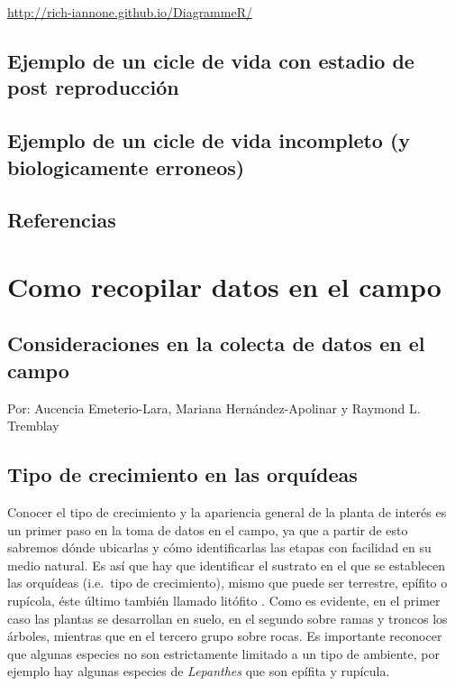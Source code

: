\documentclass[
]{book}
\theoremstyle{definition}
\theoremstyle{definition}
\theoremstyle{definition}
\theoremstyle{definition}
\theoremstyle{remark}
\begin{document}
\url{http://rich-iannone.github.io/DiagrammeR/}

\section{Ejemplo de un cicle de vida con estadio de post reproducción}\label{ejemplo-de-un-cicle-de-vida-con-estadio-de-post-reproducciuxf3n}

\section{Ejemplo de un cicle de vida incompleto (y biologicamente erroneos)}\label{ejemplo-de-un-cicle-de-vida-incompleto-y-biologicamente-erroneos}

\section{Referencias}\label{referencias-1}

\chapter{Como recopilar datos en el campo}\label{como-recopilar-datos-en-el-campo}

\section{Consideraciones en la colecta de datos en el campo}\label{consideraciones-en-la-colecta-de-datos-en-el-campo}

Por: Aucencia Emeterio-Lara, Mariana Hernández-Apolinar y Raymond L. Tremblay

\section{Tipo de crecimiento en las orquídeas}\label{tipo-de-crecimiento-en-las-orquuxeddeas}

Conocer el tipo de crecimiento y la apariencia general de la planta de interés es un primer paso en la toma de datos en el campo, ya que a partir de esto sabremos dónde ubicarlas y cómo identificarlas las etapas con facilidad en su medio natural.
Es así que hay que identificar el sustrato en el que se establecen las orquídeas (i.e.~tipo de crecimiento), mismo que puede ser terrestre, epífito o rupícola, éste último también llamado litófito \citep{tellez2007orquideas}.
Como es evidente, en el primer caso las plantas se desarrollan en suelo, en el segundo sobre ramas y troncos los árboles, mientras que en el tercero grupo sobre rocas.
Es importante reconocer que algunas especies no son estrictamente limitado a un tipo de ambiente, por ejemplo hay algunas especies de \emph{Lepanthes} que son epífita y rupícula.
\end{document}
